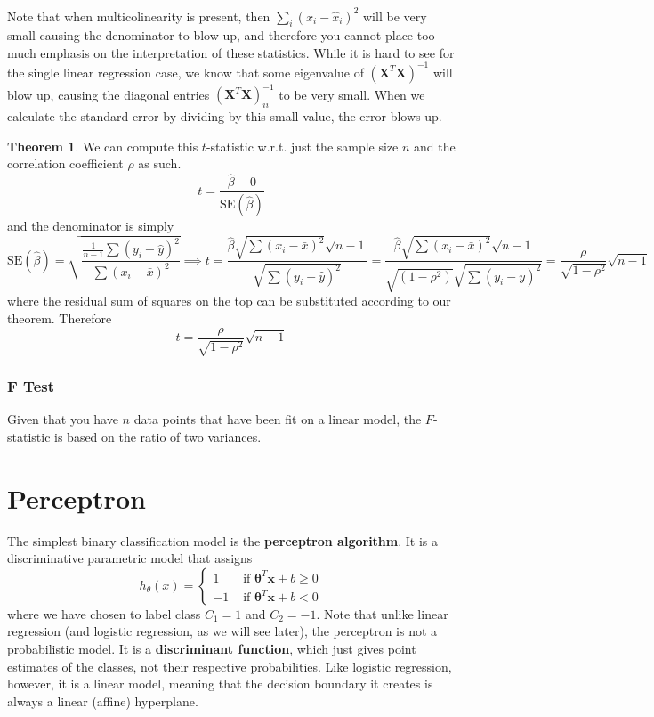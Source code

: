 \documentclass{article}
\theoremstyle{definition}
\newtheorem{theorem}{Theorem}[section]
\begin{document}
  Note that when multicolinearity is present, then $\sum_{i} (x_i - \hat{x}_i)^2$ will be very small causing the denominator to blow up, and therefore you cannot place too much emphasis on the interpretation of these statistics. While it is hard to see for the single linear regression case, we know that some eigenvalue of $(\mathbf{X}^T \mathbf{X})^{-1}$ will blow up, causing the diagonal entries $(\mathbf{X}^T \mathbf{X})^{-1}_{ii}$ to be very small. When we calculate the standard error by dividing by this small value, the error blows up. 

  \begin{theorem}
  We can compute this $t$-statistic w.r.t. just the sample size $n$ and the correlation coefficient $\rho$ as such. 
  \[t = \frac{\hat{\beta} - 0}{\mathrm{SE}(\hat{\beta})}\]
  and the denominator is simply 
  \[\mathrm{SE}(\hat{\beta}) = \sqrt{\frac{\frac{1}{n-1} \sum (y_i - \hat{y})^2}{\sum (x_i - \bar{x})^2}} \implies t = \frac{\hat{\beta} \sqrt{\sum (x_i - \bar{x})^2} \sqrt{n-1}}{\sqrt{\sum (y_i - \hat{y})^2}} = \frac{\hat{\beta} \sqrt{\sum (x_i - \bar{x})^2} \sqrt{n-1}}{\sqrt{(1 - \rho^2)} \sqrt{\sum (y_i - \bar{y})^2}} = \frac{\rho}{\sqrt{1 - \rho^2}} \sqrt{n-1}\]
  where the residual sum of squares on the top can be substituted according to our theorem. Therefore 
  \[t = \frac{\rho}{\sqrt{1 - \rho^2}} \sqrt{n-1}\]
  \end{theorem}


  \subsubsection{F Test}

  Given that you have $n$ data points that have been fit on a linear model, the $F$-statistic is based on the ratio of two variances. 

\section{Perceptron}

  The simplest binary classification model is the \textbf{perceptron algorithm}. It is a discriminative parametric model that assigns 
  \[h_\theta (x) = \begin{cases} 1 & \text{ if } \boldsymbol{\theta}^T \mathbf{x} + b \geq 0 \\ -1 & \text { if } \boldsymbol{\theta}^T \mathbf{x} + b < 0 \end{cases}\]
  where we have chosen to label class $C_1 = 1$ and $C_2 = -1$. Note that unlike linear regression (and logistic regression, as we will see later), the perceptron is not a probabilistic model. It is a \textbf{discriminant function}, which just gives point estimates of the classes, not their respective probabilities. Like logistic regression, however, it is a linear model, meaning that the decision boundary it creates is always a linear (affine) hyperplane. 
\end{document}
